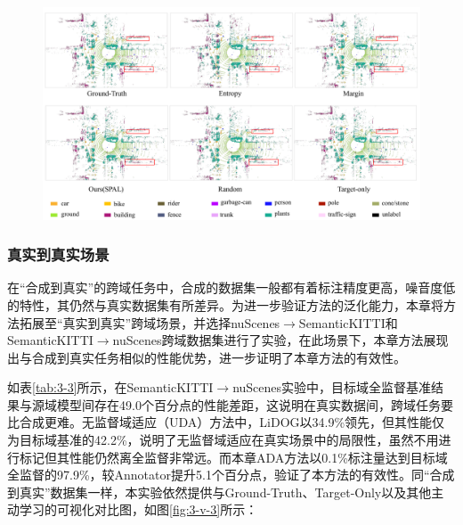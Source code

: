 \vspace{-0.1cm}
\begin{figure}[H]
    \centering
    \includegraphics[width = \textwidth]{ljx/figure/3_vision_s2p.pdf}
    \label{fig:3-v-2}
\end{figure}
\vspace{-0.35cm}

\subsubsection{真实到真实场景}
在“合成到真实”的跨域任务中，合成的数据集一般都有着标注精度更高，噪音度低的特性，其仍然与真实数据集有所差异。为进一步验证方法的泛化能力，本章将方法拓展至“真实到真实”跨域场景，并选择nuScenes\(\to\)SemanticKITTI和SemanticKITTI\(\to\)nuScenes跨域数据集进行了实验，在此场景下，本章方法展现出与合成到真实任务相似的性能优势，进一步证明了本章方法的有效性。

如表\ref{tab:3-3}所示，在SemanticKITTI$\to$nuScenes实验中，目标域全监督基准结果与源域模型间存在49.0个百分点的性能差距，这说明在真实数据间，跨域任务要比合成更难。无监督域适应（UDA）方法中，LiDOG以34.9\%领先，但其性能仅为目标域基准的42.2\%，说明了无监督域适应在真实场景中的局限性，虽然不用进行标记但其性能仍然离全监督非常远。而本章ADA方法以0.1\%标注量达到目标域全监督的97.9\%，较Annotator提升5.1个百分点，验证了本方法的有效性。同“合成到真实”数据集一样，本实验依然提供与Ground-Truth、Target-Only以及其他主动学习的可视化对比图，如图\ref{fig:3-v-3}所示：
\vspace{0.1cm}


